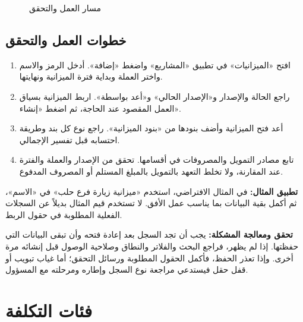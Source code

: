 \begin{figure}[H]
\centering
{}
\rclegend
\caption{مسار العمل والتحقق}
\label{fig:projects-budgets-flow}
\end{figure}

\subsection{خطوات العمل والتحقق}
\begin{enumerate}
\item افتح «الميزانيات» في تطبيق «المشاريع» واضغط «إضافة». أدخل الرمز والاسم واختر العملة وبداية فترة الميزانية ونهايتها.
\item راجع الحالة والإصدار و«الإصدار الحالي» و«أعد بواسطة». اربط الميزانية بسياق العمل المقصود عند الحاجة، ثم اضغط «إنشاء».
\item أعد فتح الميزانية وأضف بنودها من «بنود الميزانية». راجع نوع كل بند وطريقة احتسابه قبل تفسير الإجمالي.
\item تابع مصادر التمويل والمصروفات في أقسامها. تحقق من الإصدار والعملة والفترة عند المقارنة، ولا تخلط التعهد بالتمويل بالمبلغ المستلم أو المصروف المدفوع.
\end{enumerate}

\textbf{تطبيق المثال:} في المثال الافتراضي، استخدم «ميزانية زيارة فرع حلب» في «الاسم»، ثم أكمل بقية البيانات بما يناسب عمل الأفق. لا تستخدم قيم المثال بديلاً عن السجلات الفعلية المطلوبة في حقول الربط.

\textbf{تحقق ومعالجة المشكلة:} يجب أن تجد السجل بعد إعادة فتحه وأن تبقى البيانات التي حفظتها. إذا لم يظهر، فراجع البحث والفلاتر والنطاق وصلاحية الوصول قبل إنشائه مرة أخرى. وإذا تعذر الحفظ، فأكمل الحقول المطلوبة ورسائل التحقق؛ أما غياب تبويب أو قفل حقل فيستدعي مراجعة نوع السجل وإطاره ومرحلته مع المسؤول.

\clearpage
\section{فئات التكلفة}
\label{sec:projects-feature-cost-categories}

